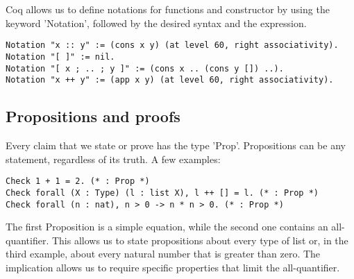 \documentclass{scrreprt}
\newcommand{\todo}[1]{\marginpar{\textbf{TODO:} #1}}
\begin{document}
Coq allows us to define notations for functions and constructor by using the keyword 'Notation', followed by the desired syntax and the expression. 
\begin{verbatim}
Notation "x :: y" := (cons x y) (at level 60, right associativity).
Notation "[ ]" := nil.
Notation "[ x ; .. ; y ]" := (cons x .. (cons y []) ..).
Notation "x ++ y" := (app x y) (at level 60, right associativity).
\end{verbatim}

\subsection{Propositions and proofs}
Every claim that we state or prove has the type 'Prop'. Propositions can be any statement, regardless of its truth. A few examples:
\begin{verbatim}
Check 1 + 1 = 2. (* : Prop *)
Check forall (X : Type) (l : list X), l ++ [] = l. (* : Prop *)
Check forall (n : nat), n > 0 -> n * n > 0. (* : Prop *)
\end{verbatim}
The first Proposition is a simple equation, while the second one contains an all-quantifier. This allows us to state propositions about every type of list or, in the third example, about every natural number that is greater than zero. The implication allows us to require specific properties that limit the all-quantifier. 
 

\appendix



\end{document}

